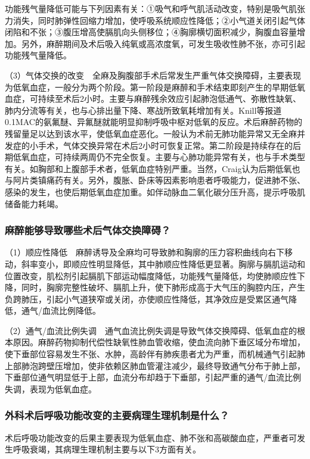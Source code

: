 功能残气量降低可能与下列因素有关：①吸气和呼气肌活动改变，特别是吸气肌张力消失，同时肺弹性回缩力增加，使呼吸系统顺应性降低；②小气道关闭引起气体闭陷和不张；③腹压增高使膈肌向头侧移位；④胸廓横切面积减少，胸腹血容量增加。另外，麻醉期间及术后吸入纯氧或高浓度氧，可发生吸收性肺不张，亦可引起功能残气量降低。

（3）气体交换的改变　全麻及胸腹部手术后常发生严重气体交换障碍，主要表现为低氧血症，一般分为两个阶段。第一阶段是麻醉和手术结束即刻产生的早期低氧血症，可持续至术后2小时。主要与麻醉残余效应引起肺泡低通气、弥散性缺氧、肺内分流等有关，也与心排出量下降、寒战所致氧耗增加有关。Knill等报道0.1MAC的氨氟醚、异氟醚就能明显抑制呼吸中枢对低氧的反应。术后麻醉药物的残留量足以达到该水平，使低氧血症恶化。一般认为术前无肺功能异常又无全麻并发症的小手术，气体交换异常在术后2小时可恢复正常。第二阶段是持续存在的后期低氧血症，可持续两周仍不完全恢复。主要与心肺功能异常有关，也与手术类型有关。如胸部和上腹部手术者，低氧血症特别严重。当然，Craig认为后期低氧也与阿片类镇痛药有关。另外，腹胀、卧床等因素影响患者呼吸能力，促进肺不张、感染的发生，也使后期低氧血症加重。如伴动脉血二氧化碳分压升高，提示呼吸肌储备能力耗竭。

\subsubsection{麻醉能够导致哪些术后气体交换障碍？}

（1）顺应性降低　麻醉诱导及全麻均可导致肺和胸廓的压力容积曲线向右下移动，斜率变小，即顺应性明显降低，其中肺顺应性降低更显著。胸廓与膈肌运动和位置改变，肌松剂引起膈肌下部运动幅度降低，功能残气量降低，均使肺顺应性下降，同时，胸廓完整性破坏、膈肌上升，使下肺形成高于大气压的胸腔内压，产生负跨肺压，引起小气道狭窄或关闭，亦使顺应性降低，其净效应是受累区通气降低，通气/血流比例降低。

（2）通气/血流比例失调　通气血流比例失调是导致气体交换障碍、低氧血症的根本原因。麻醉药物抑制代偿性缺氧性肺血管收缩，使血流向肺下垂区域分布增加，使下垂部位容易发生不张、水肿，高龄伴有肺疾患者尤为严重，而机械通气引起肺上部肺泡跨壁压增加，使非依赖区肺血管灌注减少，最终导致通气分布于肺上部，下垂部位通气明显低于上部，血流分布却趋于下垂部，引起严重的通气/血流比例失调，表现为低氧血症。

\subsubsection{外科术后呼吸功能改变的主要病理生理机制是什么？}

术后呼吸功能改变的后果主要表现为低氧血症、肺不张和高碳酸血症，严重者可发生呼吸衰竭，其病理生理机制主要与以下3方面有关。

